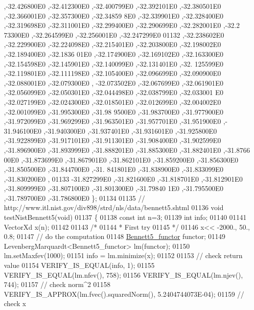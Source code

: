 \begin{DoxyCode}
      ,-32.426800E0 ,-32.412300E0 ,-32.400799E0 ,-32.392101E0 ,-32.380501E0 ,-32.366001E0 ,-32.357300E0 ,-32.34859
      8E0 ,-32.339901E0 ,-32.328400E0 ,-32.319698E0 ,-32.311001E0 ,-32.299400E0 ,-32.290699E0 ,-32.282001E0 ,-32.2
      73300E0 ,-32.264599E0 ,-32.256001E0 ,-32.247299E0
01132 ,-32.238602E0 ,-32.229900E0 ,-32.224098E0 ,-32.215401E0 ,-32.203800E0 ,-32.198002E0 ,-32.189400E0 ,-32.1836
      01E0 ,-32.174900E0 ,-32.169102E0 ,-32.163300E0 ,-32.154598E0 ,-32.145901E0 ,-32.140099E0 ,-32.131401E0 ,-32.
      125599E0 ,-32.119801E0 ,-32.111198E0 ,-32.105400E0 ,-32.096699E0 ,-32.090900E0 ,-32.088001E0 ,-32.079300E0 ,
      -32.073502E0 ,-32.067699E0 ,-32.061901E0 ,-32.056099E0 ,-32.050301E0 ,-32.044498E0 ,-32.038799E0 ,-32.033001
      E0 ,-32.027199E0 ,-32.024300E0 ,-32.018501E0 ,-32.012699E0 ,-32.004002E0 ,-32.001099E0 ,-31.995300E0 ,-31.98
      9500E0 ,-31.983700E0 ,-31.977900E0 ,-31.972099E0 ,-31.969299E0 ,-31.963501E0 ,-31.957701E0 ,-31.951900E0 ,-
      31.946100E0 ,-31.940300E0 ,-31.937401E0 ,-31.931601E0 ,-31.925800E0 ,-31.922899E0 ,-31.917101E0 ,-31.911301E0
       ,-31.908400E0 ,-31.902599E0 ,-31.896900E0 ,-31.893999E0 ,-31.888201E0 ,-31.885300E0 ,-31.882401E0 ,-31.8766
      00E0 ,-31.873699E0 ,-31.867901E0 ,-31.862101E0 ,-31.859200E0 ,-31.856300E0 ,-31.850500E0 ,-31.844700E0 ,-31.
      841801E0 ,-31.838900E0 ,-31.833099E0 ,-31.830200E0 ,
01133 -31.827299E0 ,-31.821600E0 ,-31.818701E0 ,-31.812901E0 ,-31.809999E0 ,-31.807100E0 ,-31.801300E0 ,-31.79840
      1E0 ,-31.795500E0 ,-31.789700E0 ,-31.786800E0 \};
01134 
01135 \textcolor{comment}{// http://www.itl.nist.gov/div898/strd/nls/data/bennett5.shtml}
01136 \textcolor{keywordtype}{void} testNistBennett5(\textcolor{keywordtype}{void})
01137 \{
01138   \textcolor{keyword}{const} \textcolor{keywordtype}{int}  n=3;
01139   \textcolor{keywordtype}{int} info;
01140 
01141   VectorXd x(n);
01142 
01143   \textcolor{comment}{/*}
01144 \textcolor{comment}{   * First try}
01145 \textcolor{comment}{   */}
01146   x<< -2000., 50., 0.8;
01147   \textcolor{comment}{// do the computation}
01148   \hyperlink{struct_bennett5__functor}{Bennett5\_functor} functor;
01149   LevenbergMarquardt<Bennett5\_functor> lm(functor);
01150   lm.setMaxfev(1000);
01151   info = lm.minimize(x);
01152 
01153   \textcolor{comment}{// check return value}
01154   VERIFY\_IS\_EQUAL(info, 1);
01155   VERIFY\_IS\_EQUAL(lm.nfev(), 758);
01156   VERIFY\_IS\_EQUAL(lm.njev(), 744);
01157   \textcolor{comment}{// check norm^2}
01158   VERIFY\_IS\_APPROX(lm.fvec().squaredNorm(), 5.2404744073E-04);
01159   \textcolor{comment}{// check x}

\end{DoxyCode}
